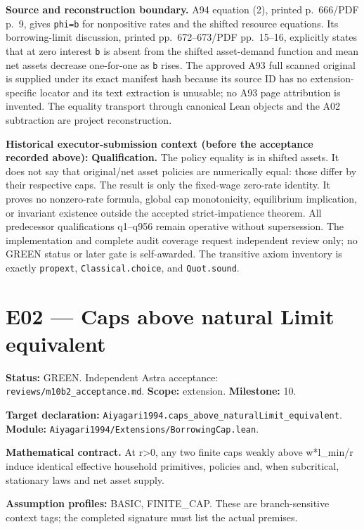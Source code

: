 \documentclass[
  11pt,
]{article}
\let\LedgerOriginalTexttt\texttt
\renewcommand{\texttt}[1]{{\small\LedgerOriginalTexttt{#1}}}
\begin{document}
\textbf{Source and reconstruction boundary.} A94 equation (2), printed
p.~666/PDF p.~9, gives \texttt{phi=b} for nonpositive rates and the
shifted resource equations. Its borrowing-limit discussion, printed
pp.~672--673/PDF pp.~15--16, explicitly states that at zero interest
\texttt{b} is absent from the shifted asset-demand function and mean net
assets decrease one-for-one as \texttt{b} rises. The approved A93 full
scanned original is supplied under its exact manifest hash because its
source ID has no extension-specific locator and its text extraction is
unusable; no A93 page attribution is invented. The equality transport
through canonical Lean objects and the A02 subtraction are project
reconstruction.

\textbf{Historical executor-submission context (before the acceptance
recorded above):} \textbf{Qualification.} The policy equality is in
shifted assets. It does not say that original/net asset policies are
numerically equal: those differ by their respective caps. The result is
only the fixed-wage zero-rate identity. It proves no nonzero-rate
formula, global cap monotonicity, equilibrium implication, or invariant
existence outside the accepted strict-impatience theorem. All
predecessor qualifications q1--q956 remain operative without
supersession. The implementation and complete audit coverage request
independent review only; no GREEN status or later gate is self-awarded.
The transitive axiom inventory is exactly \texttt{propext},
\texttt{Classical.choice}, and \texttt{Quot.sound}.

\section{E02 --- Caps above natural Limit
equivalent}\label{e02-caps-above-natural-limit-equivalent}

\textbf{Status:} GREEN. Independent Astra acceptance:
\texttt{reviews/m10b2\_acceptance.md}. \textbf{Scope:} extension.
\textbf{Milestone:} 10.

\textbf{Target declaration:}
\texttt{Aiyagari1994.caps\_above\_naturalLimit\_equivalent}.\\
\textbf{Module:} \texttt{Aiyagari1994/Extensions/BorrowingCap.lean}.

\textbf{Mathematical contract.} At r\textgreater0, any two finite caps
weakly above w*l\_min/r induce identical effective household primitives,
policies and, when subcritical, stationary laws and net asset supply.

\textbf{Assumption profiles:} BASIC, FINITE\_CAP. These are
branch-sensitive context tags; the completed signature must list the
actual premises.
\end{document}
